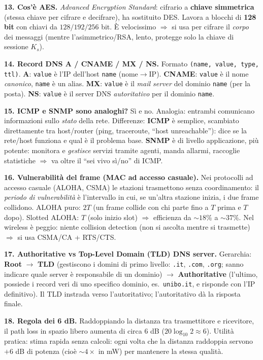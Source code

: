 \documentclass[11pt,a4paper]{report}
\begin{document}
\textbf{13. Cos'è AES.} \emph{Advanced Encryption Standard}: cifrario a
\textbf{chiave simmetrica} (stessa chiave per cifrare e decifrare), ha sostituito
DES. Lavora a blocchi di \textbf{128 bit} con chiavi da $128/192/256$ bit. È
velocissimo $\Rightarrow$ si usa per cifrare il \emph{corpo} dei messaggi (mentre
l'asimmetrico/RSA, lento, protegge solo la chiave di sessione $K_s$).

\textbf{14. Record DNS A / CNAME / MX / NS.} Formato \texttt{(name, value, type,
ttl)}. \textbf{A}: \texttt{value} è l'IP dell'host \texttt{name} (nome$\to$IP).
\textbf{CNAME}: \texttt{value} è il nome \emph{canonico}, \texttt{name} è un alias.
\textbf{MX}: \texttt{value} è il \emph{mail server} del dominio \texttt{name}
(per la posta). \textbf{NS}: \texttt{value} è il server DNS \emph{autoritativo}
per il dominio \texttt{name}.

\textbf{15. ICMP e SNMP sono analoghi?} Sì e no. Analogia: entrambi comunicano
informazioni sullo \emph{stato} della rete. Differenze: \textbf{ICMP} è semplice,
scambiato direttamente tra host/router (ping, traceroute, ``host unreachable''):
dice se la rete/host funziona e qual è il problema base. \textbf{SNMP} è di
livello applicazione, più potente: monitora e \emph{gestisce} servizi tramite
agenti, manda allarmi, raccoglie statistiche $\Rightarrow$ va oltre il ``sei vivo
sì/no'' di ICMP.

\textbf{16. Vulnerabilità del frame (MAC ad accesso casuale).} Nei protocolli ad
accesso casuale (ALOHA, CSMA) le stazioni trasmettono senza coordinamento: il
\emph{periodo di vulnerabilità} è l'intervallo in cui, se un'altra stazione
inizia, i due frame collidono. ALOHA puro: $2T$ (un frame collide con chi parte
fino a $T$ prima e $T$ dopo). Slotted ALOHA: $T$ (solo inizio slot)
$\Rightarrow$ efficienza da $\sim18\%$ a $\sim37\%$. Nel wireless è peggio:
niente collision detection (non si ascolta mentre si trasmette) $\Rightarrow$ si
usa CSMA/CA + RTS/CTS.

\textbf{17. Authoritative vs Top-Level Domain (TLD) DNS server.} Gerarchia:
\textbf{Root} $\to$ \textbf{TLD} (gestiscono i domini di primo livello: \texttt{.it},
\texttt{.com}, \texttt{.org}; sanno indicare quale server è responsabile di un
dominio) $\to$ \textbf{Authoritative} (l'ultimo, possiede i record veri di uno
specifico dominio, es.\ \texttt{unibo.it}, e risponde con l'IP definitivo). Il
TLD instrada verso l'autoritativo; l'autoritativo dà la risposta finale.

\textbf{18. Regola dei 6 dB.} Raddoppiando la distanza tra trasmettitore e
ricevitore, il path loss in spazio libero aumenta di circa $6$ dB
($20\log_{10}2\approx 6$). Utilità pratica: stima rapida senza calcoli: ogni
volta che la distanza raddoppia servono $+6$ dB di potenza (cioè $\sim4\times$ in
mW) per mantenere la stessa qualità.
\end{document}
